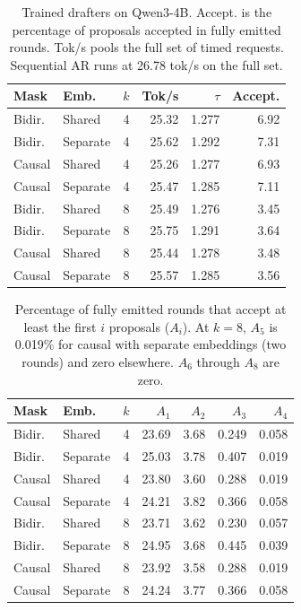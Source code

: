 \begin{table}[t]
\centering
\small
\setlength{\tabcolsep}{3pt}
\begin{tabular}{llrrrr}
\toprule
Mask & Emb. & $k$ & Tok/s & $\tau$ & Accept. \\
\midrule
Bidir. & Shared & 4 & 25.32 & 1.277 & 6.92 \\
Bidir. & Separate & 4 & 25.62 & 1.292 & 7.31 \\
Causal & Shared & 4 & 25.26 & 1.277 & 6.93 \\
Causal & Separate & 4 & 25.47 & 1.285 & 7.11 \\
\addlinespace
Bidir. & Shared & 8 & 25.49 & 1.276 & 3.45 \\
Bidir. & Separate & 8 & 25.75 & 1.291 & 3.64 \\
Causal & Shared & 8 & 25.44 & 1.278 & 3.48 \\
Causal & Separate & 8 & 25.57 & 1.285 & 3.56 \\
\bottomrule
\end{tabular}
\caption{Trained drafters on Qwen3-4B. Accept. is the percentage of
proposals accepted in fully emitted rounds. Tok/s pools the full set of
timed requests. Sequential AR runs at 26.78 tok/s on the full set.}
\label{tab:trained-draft}
\end{table}

\begin{table}[t]
\centering
\small
\setlength{\tabcolsep}{3pt}
\begin{tabular}{llrrrrr}
\toprule
Mask & Emb. & $k$ & $A_1$ & $A_2$ & $A_3$ & $A_4$ \\
\midrule
Bidir. & Shared & 4 & 23.69 & 3.68 & 0.249 & 0.058 \\
Bidir. & Separate & 4 & 25.03 & 3.78 & 0.407 & 0.019 \\
Causal & Shared & 4 & 23.80 & 3.60 & 0.288 & 0.019 \\
Causal & Separate & 4 & 24.21 & 3.82 & 0.366 & 0.058 \\
\addlinespace
Bidir. & Shared & 8 & 23.71 & 3.62 & 0.230 & 0.057 \\
Bidir. & Separate & 8 & 24.95 & 3.68 & 0.445 & 0.039 \\
Causal & Shared & 8 & 23.92 & 3.58 & 0.288 & 0.019 \\
Causal & Separate & 8 & 24.24 & 3.77 & 0.366 & 0.058 \\
\bottomrule
\end{tabular}
\caption{Percentage of fully emitted rounds that accept at least the first
$i$ proposals ($A_i$). At $k=8$, $A_5$ is 0.019\% for causal with separate
embeddings (two rounds) and zero elsewhere. $A_6$ through $A_8$ are zero.}
\label{tab:trained-draft-position}
\end{table}

